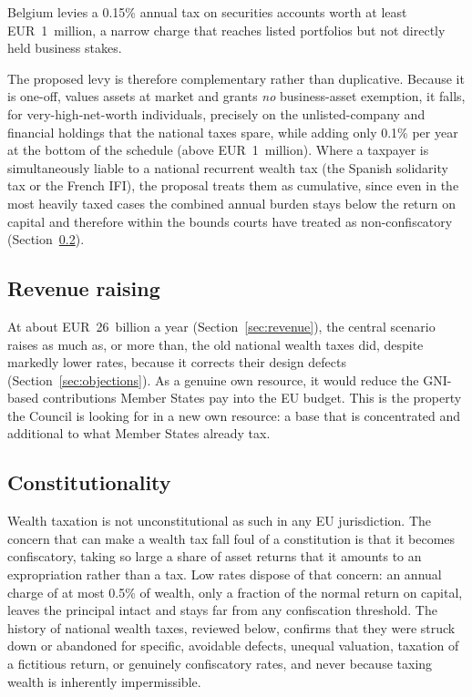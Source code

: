 \documentclass[../../main]{subfiles}
\begin{document}
Belgium levies a 0.15\% annual tax on securities accounts worth at least EUR~1~million, a narrow charge that reaches listed portfolios but not directly held business stakes.

The proposed levy is therefore complementary rather than duplicative. Because it is one-off, values assets at market and grants \emph{no} business-asset exemption, it falls, for very-high-net-worth individuals, precisely on the unlisted-company and financial holdings that the national taxes spare, while adding only 0.1\% per year at the bottom of the schedule (above EUR~1~million). Where a taxpayer is simultaneously liable to a national recurrent wealth tax (the Spanish solidarity tax or the French IFI), %
the proposal treats them as cumulative, since even in the most heavily taxed cases the combined annual burden stays below the return on capital and therefore within the bounds courts have treated as non-confiscatory (Section~\ref{sec:constitutionality}).

\subsection{Revenue raising} %

At about EUR~26~billion a year (Section~\ref{sec:revenue}), the central scenario raises as much as, or more than, the old national wealth taxes did, despite markedly lower rates, because it corrects their design defects (Section~\ref{sec:objections}). As a genuine own resource, it would reduce the GNI-based contributions Member States pay into the EU budget. %
This is the property the Council is looking for in a new own resource: a base that is concentrated and additional to what Member States already tax.

\subsection{Constitutionality}
\label{sec:constitutionality}

Wealth taxation is not unconstitutional as such in any EU jurisdiction. The concern that can make a wealth tax fall foul of a constitution is that it becomes confiscatory, taking so large a share of asset returns that it amounts to an expropriation rather than a tax. Low rates dispose of that concern: an annual charge of at most 0.5\% of wealth, only a fraction of the normal return on capital, leaves the principal intact and stays far from any confiscation threshold. The history of national wealth taxes, reviewed below, confirms that they were struck down or abandoned for specific, avoidable defects, unequal valuation, taxation of a fictitious return, or genuinely confiscatory rates, and never because taxing wealth is inherently impermissible.
\end{document}
